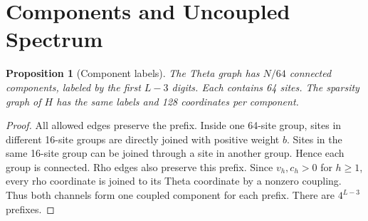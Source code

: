 \documentclass[journal,a4paper,10pt]{IEEEtran}
\newtheorem{proposition}[theorem]{Proposition}
\theoremstyle{definition}\newtheorem{definition}[theorem]{Definition}
\theoremstyle{remark}\newtheorem{remark}[theorem]{Remark}
\begin{document}
\section{Components and Uncoupled Spectrum}
\begin{proposition}[Component labels]\label{prop:components}
The Theta graph has $N/64$ connected components, labeled by the first $L-3$ digits. Each contains 64 sites. The sparsity graph of $H$ has the same labels and 128 coordinates per component.
\end{proposition}
\begin{proof}
All allowed edges preserve the prefix. Inside one 64-site group, sites in different 16-site groups are directly joined with positive weight $b$. Sites in the same 16-site group can be joined through a site in another group. Hence each group is connected. Rho edges also preserve this prefix. Since $v_h,c_h>0$ for $h\geq1$, every rho coordinate is joined to its Theta coordinate by a nonzero coupling. Thus both channels form one coupled component for each prefix. There are $4^{L-3}$ prefixes.
\end{proof}
\end{document}
